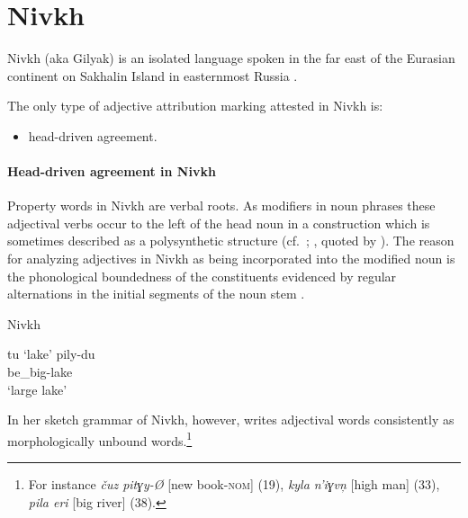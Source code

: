 \section{Nivkh}
Nivkh (aka Gilyak) is an isolated language spoken in the far east of the Eurasian continent on Sakhalin Island in easternmost Russia \citep[222–223]{salminen2007}.

The only type of adjective attribution marking attested in Nivkh is:
\begin{itemize}
\item head\hyp{}driven agreement.
\end{itemize}

\paragraph*{Head\hyp{}driven agreement in Nivkh}
Property words in Nivkh are verbal roots. As modifiers in noun phrases these adjectival verbs occur to the left of the head noun in a construction which is sometimes described as a polysynthetic structure (cf.~\citealt[16]{gruzdeva1998}; \citealt[80]{jakobson1971}, quoted by \citealt[138]{rijkhoff2002}). The reason for analyzing adjectives in Nivkh as being incorporated into the modified noun is the phonological boundedness of the constituents evidenced by regular alternations in the initial segments of the noun stem \cite[16]{gruzdeva1998}.
\begin{exe}
\ex \rm{Nivkh \citep[16]{gruzdeva1998}}
\begin{xlist}
\ex tu ‘lake’
\ex 
\gll	pily-du\\
	be\_big-lake\\
\glt	‘large lake’
\end{xlist}
\end{exe}
In her sketch grammar of Nivkh, however, \cite{gruzdeva1998} writes adjectival words consistently as morphologically unbound words.\footnote{For instance \textit{čuz pitɣy-Ø} [new book-\textsc{nom}] (19), \textit{kyla n'iɣvn̦} [high man] (33), \textit{pila eri} [big river] (38).}

